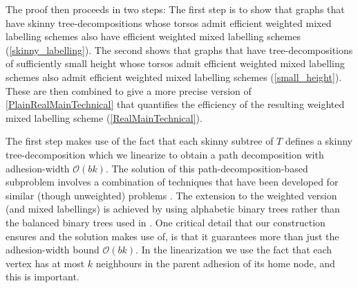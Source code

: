 \documentclass{patmorin}
\newcommand{\Oh}{\mathcal{O}}
\begin{document}
  The proof then proceeds in two steps: The first step is to show that graphs that have skinny tree-decompositions whose torsos admit efficient weighted mixed labelling schemes also have efficient weighted mixed labelling schemes (\cref{skinny_labelling}). The second shows that graphs that have tree-decompositions of sufficiently small height  whose torsos admit efficient weighted mixed labelling schemes also admit efficient weighted mixed labelling schemes (\cref{small_height}).  These are then combined to give a more precise version of \cref{PlainRealMainTechnical} that quantifies the efficiency of the resulting weighted mixed labelling scheme (\cref{RealMainTechnical}).

  The first step makes use of the fact that each skinny subtree of $T$ defines a skinny tree-decomposition which we linearize to obtain a path decomposition with adhesion-width $\Oh(bk)$. The solution of this path-decomposition-based subproblem involves a combination of techniques that have been developed for similar (though unweighted) problems \cite{gavoille.labourel:shorter,dujmovic.esperet.ea:adjacency}. The extension to the weighted version (and mixed labellings) is achieved by using alphabetic binary trees rather than the balanced binary trees used in \cite{gavoille.labourel:shorter,dujmovic.esperet.ea:adjacency}.  One critical detail  that our construction ensures and the solution makes use of, is that it guarantees more than just the adhesion-width bound \(\Oh(bk)\). In the linearization we use the fact that each vertex has at most $k$ neighbours in the parent adhesion of its home node, and this is important.
\end{document}
